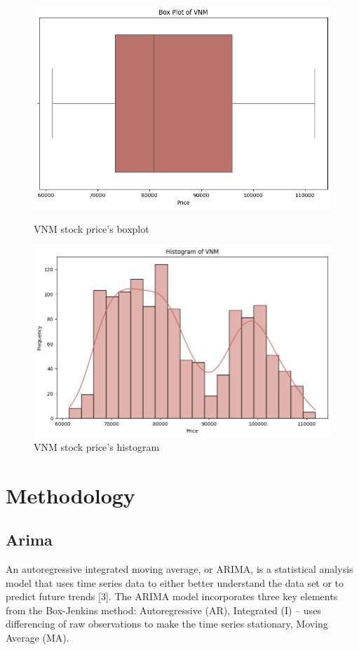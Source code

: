 \documentclass{ieeeojies}
\begin{document}
\begin{figure}[H]
    \centering
    \begin{minipage}{0.23\textwidth}
    \centering
    \includegraphics[width=1\textwidth]{BoxPlotOfVNM.png}
    \caption{VNM stock price's boxplot}
    \label{fig:1}
    \end{minipage}
    \hfill
    \begin{minipage}{0.23\textwidth}
    \centering
    \includegraphics[width=1\textwidth]{HistogramOfVNM.png}
    \caption{VNM stock price's histogram}
    \label{fig:2}
    \end{minipage}
\end{figure}

\section{Methodology}
\subsection{Arima}
An autoregressive integrated moving average, or ARIMA, is a statistical analysis model that uses time series data to either better understand the data set or to predict future trends [3]. The ARIMA model incorporates three key elements from the Box-Jenkins method: Autoregressive (AR), Integrated (I) – uses differencing of raw observations to make the time series stationary, Moving Average (MA).
\end{document}
